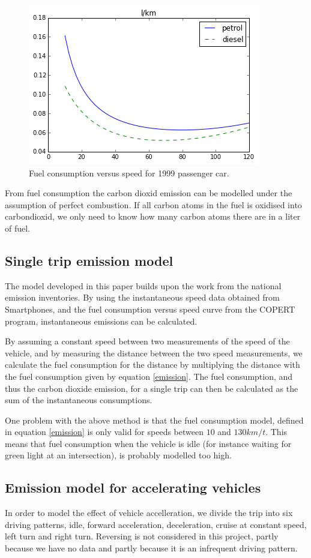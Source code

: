 \begin{figure}[h]
  \includegraphics[scale=0.5]{fc_dieselpetrol}
  \caption{Fuel consumption versus speed for 1999 passenger car.}
  \label{FC}
\end{figure}

From fuel consumption the carbon dioxid emission can be modelled under the assumption of perfect combustion. If all carbon atoms in the fuel is oxidised into carbondioxid, we only need to know how many carbon atoms there are in a liter of fuel.

\subsection{Single trip emission model}
The model developed in this paper builds upon the work from the national emission inventories. By using the instantaneous speed data obtained from Smartphones, and the fuel consumption versus speed curve from the COPERT program, instantaneous emissions can be calculated.

By assuming a constant speed between two measurements of the speed of the vehicle, and by measuring the distance between the two speed measurements, we calculate the fuel consumption for the distance by multiplying the distance with the fuel consumption given by equation \ref{emission}. The fuel consumption, and thus the carbon dioxide emission, for a single trip can then be calculated as the sum of the instantaneous consumptions.

One problem with the above method is that the fuel consumption model, defined in equation \ref{emission} is only valid for speeds between $10$ and $130 km/t$. This means that fuel consumption when the vehicle is idle (for instance waiting for green light at an intersection), is probably modelled too high.


\subsection{Emission model for accelerating vehicles}

In order to model the effect of vehicle accelleration, we divide the trip into six driving patterns, idle, forward acceleration, deceleration, cruise at constant speed, left turn and right turn. Reversing is not considered in this project, partly because we have no data and partly because it is an infrequent driving pattern. 


 
